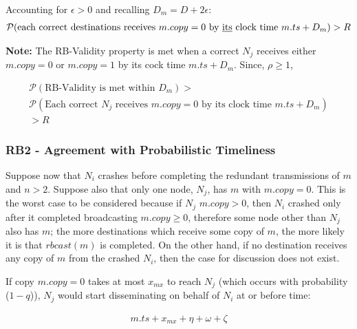         Accounting for $\epsilon > 0$ and recalling $D_m = D + 2\epsilon$:
        \begin{equation}
        \begin{aligned}
                \mathcal{P}(\text{each correct destinations receives } m.copy = 0 \text{ by \underline{its} clock time } m.ts + D_m) > R
            \end{aligned}
        \end{equation}
        
        \textbf{Note:} The RB-Validity property is met when a correct $N_j$ receives either $m.copy = 0$ or $m.copy = 1$ by its cock time $m.ts + D_m$.  Since, $\rho \geq 1$,
        
         \begin{equation}
        \begin{aligned}
                \mathcal{P}(\text{RB-Validity is met within } D_m) > \\ \mathcal{P}(\text{Each correct } N_j \text{ receives } m.copy = 0 \text{ by its clock time } m.ts+D_m) \\ > R
            \end{aligned}
        \end{equation}
        
        
    \subsubsection*{RB2 - Agreement with Probabilistic Timeliness}
    Suppose now that $N_i$ crashes before completing the redundant transmissions of $m$ and $n>2$.  Suppose also that only one node, $N_j$, has $m$ with $m.copy=0$. This is the worst case to be considered because if $N_j$ $m.copy>0$, then $N_i$ crashed only after it completed broadcasting $m.copy \geq 0$, therefore some node other than $N_j$ also has $m$; the more destinations which receive some copy of $m$, the more likely it is that $rbcast(m)$ is completed.  On the other hand, if no destination receives any copy of $m$ from the crashed $N_i$, then the case for discussion does not exist.  
    
    If copy $m.copy = 0$ takes at most $x_{mx}$ to reach $N_j$ (which occurs with probability ($1-q$)), $N_j$ would start disseminating on behalf of $N_i$ at or before time:
    
    \begin{equation}
             \begin{aligned}
                m.ts+ x_{mx} + \eta + \omega +\zeta
             \end{aligned}
         \end{equation}    
    
